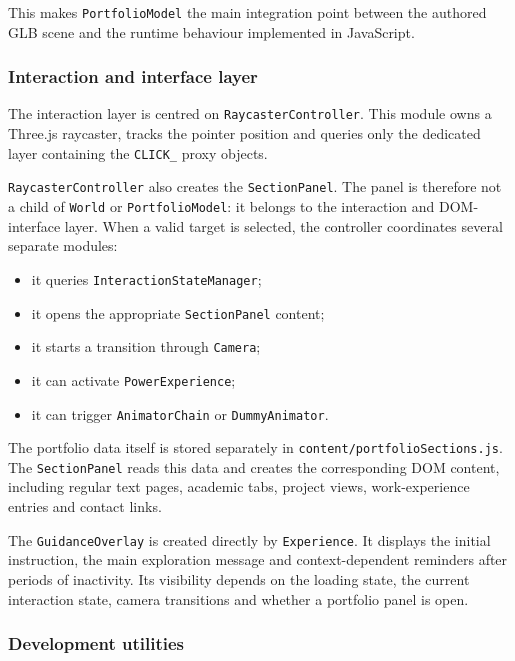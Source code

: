 \documentclass{report}
\begin{document}
This makes \texttt{PortfolioModel} the main integration point between
the authored GLB scene and the runtime behaviour implemented in
JavaScript.

\subsubsection{Interaction and interface layer}

The interaction layer is centred on
\texttt{RaycasterController}. This module owns a Three.js raycaster,
tracks the pointer position and queries only the dedicated layer
containing the \texttt{CLICK\_} proxy objects.

\texttt{RaycasterController} also creates the
\texttt{SectionPanel}. The panel is therefore not a child of
\texttt{World} or \texttt{PortfolioModel}: it belongs to the
interaction and DOM-interface layer. When a valid target is selected,
the controller coordinates several separate modules:

\begin{itemize}
    \item it queries \texttt{InteractionStateManager};
    \item it opens the appropriate \texttt{SectionPanel} content;
    \item it starts a transition through \texttt{Camera};
    \item it can activate \texttt{PowerExperience};
    \item it can trigger \texttt{AnimatorChain} or
    \texttt{DummyAnimator}.
\end{itemize}

The portfolio data itself is stored separately in
\texttt{content/portfolioSections.js}. The
\texttt{SectionPanel} reads this data and creates the corresponding DOM
content, including regular text pages, academic tabs, project views,
work-experience entries and contact links.

The \texttt{GuidanceOverlay} is created directly by
\texttt{Experience}. It displays the initial instruction, the main
exploration message and context-dependent reminders after periods of
inactivity. Its visibility depends on the loading state, the current
interaction state, camera transitions and whether a portfolio panel is
open.

\subsubsection{Development utilities}
\end{document}
